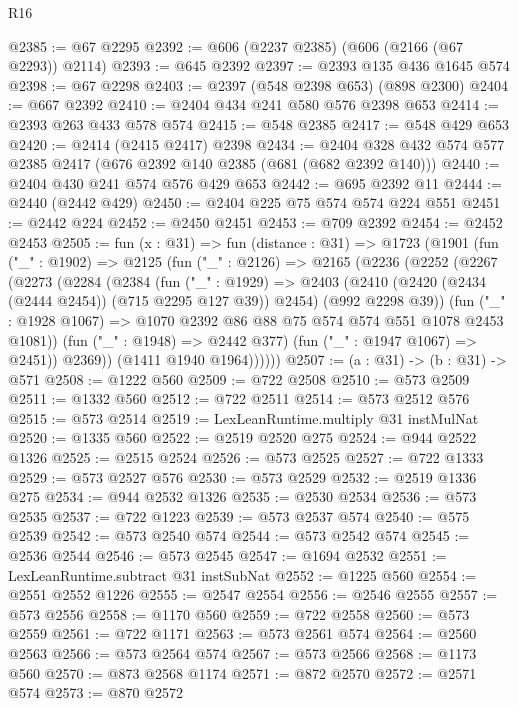 \begin{lexlean}{R16}
\begin{coremodule}
@2385 := @67 @2295
@2392 := @606 (@2237 @2385) (@606 (@2166 (@67 @2293)) @2114)
@2393 := @645 @2392
@2397 := @2393 @135 @436 @1645 @574
@2398 := @67 @2298
@2403 := @2397 (@548 @2398 @653) (@898 @2300)
@2404 := @667 @2392
@2410 := @2404 @434 @241 @580 @576 @2398 @653
@2414 := @2393 @263 @433 @578 @574
@2415 := @548 @2385
@2417 := @548 @429 @653
@2420 := @2414 (@2415 @2417) @2398
@2434 := @2404 @328 @432 @574 @577 @2385 @2417 (@676 @2392 @140 @2385 (@681 (@682 @2392 @140)))
@2440 := @2404 @430 @241 @574 @576 @429 @653
@2442 := @695 @2392 @11
@2444 := @2440 (@2442 @429)
@2450 := @2404 @225 @75 @574 @574 @224 @551
@2451 := @2442 @224
@2452 := @2450 @2451
@2453 := @709 @2392
@2454 := @2452 @2453
@2505 := fun (x : @31) =>
  fun (distance : @31) =>
  @1723
    (@1901
      (fun ("_" : @1902) =>
      @2125
        (fun ("_" : @2126) =>
        @2165
          (@2236
            (@2252
              (@2267
                (@2273
                  (@2284
                    (@2384
                      (fun ("_" : @1929) =>
                      @2403
                        (@2410 (@2420 (@2434 (@2444 @2454)) (@715 @2295 @127 @39)) @2454)
                        (@992 @2298 @39))
                      (fun ("_" : @1928 @1067) =>
                      @1070 @2392 @86 @88 @75 @574 @574 @551 @1078 @2453 @1081))
                    (fun ("_" : @1948) => @2442 @377)
                    (fun ("_" : @1947 @1067) => @2451))
                  @2369))
              (@1411 @1940 @1964))))))
@2507 := (a : @31) -> (b : @31) -> @571
@2508 := @1222 @560
@2509 := @722 @2508
@2510 := @573 @2509
@2511 := @1332 @560
@2512 := @722 @2511
@2514 := @573 @2512 @576
@2515 := @573 @2514
@2519 := LexLeanRuntime.multiply @31 instMulNat
@2520 := @1335 @560
@2522 := @2519 @2520 @275
@2524 := @944 @2522 @1326
@2525 := @2515 @2524
@2526 := @573 @2525
@2527 := @722 @1333
@2529 := @573 @2527 @576
@2530 := @573 @2529
@2532 := @2519 @1336 @275
@2534 := @944 @2532 @1326
@2535 := @2530 @2534
@2536 := @573 @2535
@2537 := @722 @1223
@2539 := @573 @2537 @574
@2540 := @575 @2539
@2542 := @573 @2540 @574
@2544 := @573 @2542 @574
@2545 := @2536 @2544
@2546 := @573 @2545
@2547 := @1694 @2532
@2551 := LexLeanRuntime.subtract @31 instSubNat
@2552 := @1225 @560
@2554 := @2551 @2552 @1226
@2555 := @2547 @2554
@2556 := @2546 @2555
@2557 := @573 @2556
@2558 := @1170 @560
@2559 := @722 @2558
@2560 := @573 @2559
@2561 := @722 @1171
@2563 := @573 @2561 @574
@2564 := @2560 @2563
@2566 := @573 @2564 @574
@2567 := @573 @2566
@2568 := @1173 @560
@2570 := @873 @2568 @1174
@2571 := @872 @2570
@2572 := @2571 @574
@2573 := @870 @2572

\end{coremodule}
\end{lexlean}
